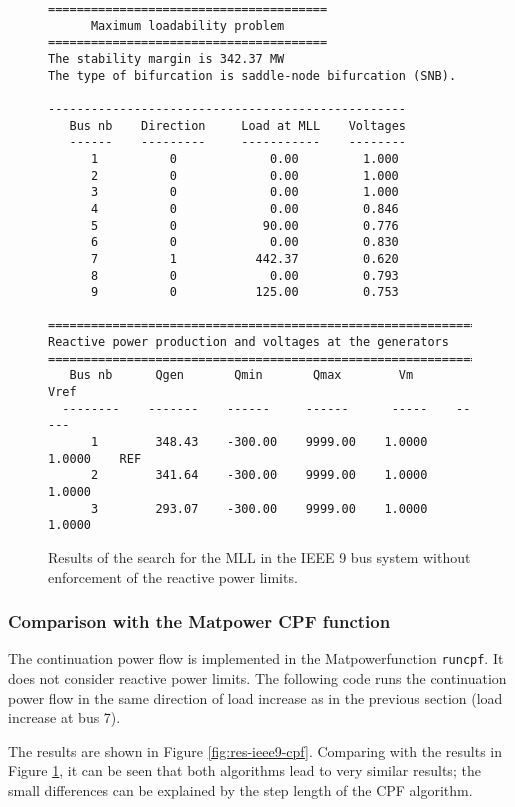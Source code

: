 \documentclass[12pt,a4]{article}
\newcommand*{\codemat}[1]{\texttt{#1}}
\newcommand*{\matpower}{{\sc Matpower}}
\begin{document}
\begin{figure}[!hb]
  \centering
\begin{verbatim}
=======================================
      Maximum loadability problem
=======================================
The stability margin is 342.37 MW
The type of bifurcation is saddle-node bifurcation (SNB).

--------------------------------------------------
   Bus nb    Direction     Load at MLL    Voltages 
   ------    ---------     -----------    --------
      1          0             0.00         1.000
      2          0             0.00         1.000
      3          0             0.00         1.000
      4          0             0.00         0.846
      5          0            90.00         0.776
      6          0             0.00         0.830
      7          1           442.37         0.620
      8          0             0.00         0.793
      9          0           125.00         0.753

=============================================================
Reactive power production and voltages at the generators
=============================================================
   Bus nb      Qgen       Qmin       Qmax        Vm      Vref
  --------    -------    ------     ------      -----    -----
      1        348.43    -300.00    9999.00    1.0000   1.0000    REF
      2        341.64    -300.00    9999.00    1.0000   1.0000
      3        293.07    -300.00    9999.00    1.0000   1.0000
\end{verbatim}  
  \caption{Results of the search for the MLL in the IEEE 9 bus system without enforcement of the reactive power limits.}\label{fig:res-ieee9-noQ}
\end{figure}

\subsubsection{Comparison with the \matpower{} CPF function}
\label{sec:comp-with-matp}

The continuation power flow is implemented in the \matpower function \codemat{runcpf}.
It does not consider reactive power limits.
The following code runs the continuation power flow in the same direction of load increase as in the previous section (load increase at bus 7).



The results are shown in Figure \ref{fig:res-ieee9-cpf}.
Comparing with the results in Figure \ref{fig:res-ieee9-noQ}, it can be seen that both algorithms lead to very similar results; the small differences can be explained by the step length of the CPF algorithm.
\end{document}
